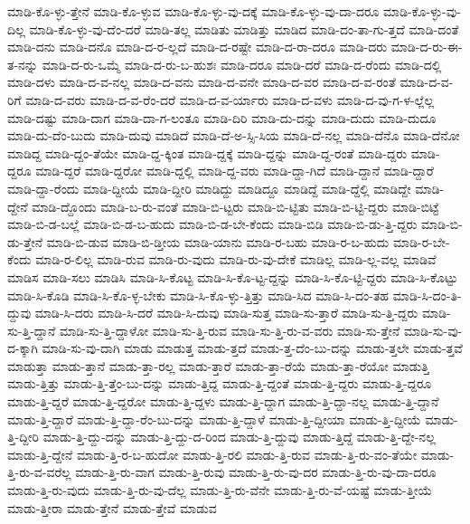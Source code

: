 {ಮಾಡಿ-ಕೊ-ಳ್ಳು-ತ್ತೇನೆ
ಮಾಡಿ-ಕೊ-ಳ್ಳುವ
ಮಾಡಿ-ಕೊ-ಳ್ಳು-ವು-ದಕ್ಕೆ
ಮಾಡಿ-ಕೊ-ಳ್ಳು-ವು-ದಾ-ದರೂ
ಮಾಡಿ-ಕೊ-ಳ್ಳು-ವು-ದಿಲ್ಲ
ಮಾಡಿ-ಕೊ-ಳ್ಳು-ವು-ದೆಂ-ದರೆ
ಮಾಡಿ-ತಲ್ಲ
ಮಾಡಿತು
ಮಾಡಿತ್ತು
ಮಾಡಿದ
ಮಾಡಿ-ದಂ-ತಾ-ಗು-ತ್ತದೆ
ಮಾಡಿ-ದಂತೆ
ಮಾಡಿ-ದನು
ಮಾಡಿ-ದನೊ
ಮಾಡಿ-ದ-ರ-ಲ್ಲದೆ
ಮಾಡಿ-ದ-ರಷ್ಟೇ
ಮಾಡಿ-ದ-ರಾ-ದರೂ
ಮಾಡಿ-ದರು
ಮಾಡಿ-ದ-ರು-ಈ-ತ-ನನ್ನು
ಮಾಡಿ-ದ-ರು-ಒಮ್ಮೆ
ಮಾಡಿ-ದ-ರು-ಬ-ಹುಶಃ
ಮಾಡಿ-ದರೂ
ಮಾಡಿ-ದರೆ
ಮಾಡಿ-ದ-ರೆಂದು
ಮಾಡಿ-ದಲ್ಲಿ
ಮಾಡಿ-ದಳು
ಮಾಡಿ-ದ-ವ-ನಲ್ಲ
ಮಾಡಿ-ದ-ವನು
ಮಾಡಿ-ದ-ವನೇ
ಮಾಡಿ-ದ-ವರ
ಮಾಡಿ-ದ-ವ-ರಂತೆ
ಮಾಡಿ-ದ-ವ-ರಿಗೆ
ಮಾಡಿ-ದ-ವರು
ಮಾಡಿ-ದ-ವ-ರೆಂ-ದರೆ
ಮಾಡಿ-ದ-ವ-ರ್ಯಾರು
ಮಾಡಿ-ದ-ವಳು
ಮಾಡಿ-ದ-ವು-ಗ-ಳ-ಲ್ಲೆಲ್ಲ
ಮಾಡಿ-ದಷ್ಟು
ಮಾಡಿ-ದಾಗ
ಮಾಡಿ-ದಾ-ಗ-ಲಂತೂ
ಮಾಡಿ-ದಿರಿ
ಮಾಡಿ-ದು-ದನ್ನು
ಮಾಡಿ-ದುದು
ಮಾಡಿ-ದುದೂ
ಮಾಡಿ-ದು-ದೆಂ-ಬುದು
ಮಾಡಿ-ದುವು
ಮಾಡಿದೆ
ಮಾಡಿ-ದೆ-ಅ-ಸ್ಸಿ-ಸಿಯ
ಮಾಡಿ-ದೆ-ನಲ್ಲ
ಮಾಡಿ-ದೆನೊ
ಮಾಡಿ-ದೆನೋ
ಮಾಡಿದ್ದ
ಮಾಡಿ-ದ್ದಂ-ತೆಯೇ
ಮಾಡಿ-ದ್ದ-ಕ್ಕಿಂತ
ಮಾಡಿ-ದ್ದಕ್ಕೆ
ಮಾಡಿ-ದ್ದನ್ನು
ಮಾಡಿ-ದ್ದ-ರಂತೆ
ಮಾಡಿ-ದ್ದರು
ಮಾಡಿ-ದ್ದರೂ
ಮಾಡಿ-ದ್ದರೆ
ಮಾಡಿ-ದ್ದರೋ
ಮಾಡಿ-ದ್ದಲ್ಲಿ
ಮಾಡಿ-ದ್ದ-ವರು
ಮಾಡಿ-ದ್ದಾ-ಗಿದೆ
ಮಾಡಿ-ದ್ದಾನೆ
ಮಾಡಿ-ದ್ದಾರೆ
ಮಾಡಿ-ದ್ದಾ-ರೆಂದು
ಮಾಡಿ-ದ್ದೀಯೆ
ಮಾಡಿ-ದ್ದೀರಿ
ಮಾಡಿದ್ದು
ಮಾಡಿದ್ದೂ
ಮಾಡಿದ್ದೆ
ಮಾಡಿ-ದ್ದೆಲ್ಲಿ
ಮಾಡಿದ್ದೇ
ಮಾಡಿ-ದ್ದೇನೆ
ಮಾಡಿ-ದ್ದೊಂದು
ಮಾಡಿ-ಬ-ರು-ವಂತೆ
ಮಾಡಿ-ಬಿ-ಟ್ಟರು
ಮಾಡಿ-ಬಿ-ಟ್ಟಿತು
ಮಾಡಿ-ಬಿ-ಟ್ಟಿ-ದ್ದರು
ಮಾಡಿ-ಬಿಟ್ಟೆ
ಮಾಡಿ-ಬಿ-ಡ-ಬಲ್ಲೆ
ಮಾಡಿ-ಬಿ-ಡ-ಬ-ಹುದು
ಮಾಡಿ-ಬಿ-ಡ-ಬೇ-ಕೆಂದು
ಮಾಡಿ-ಬಿಡಿ
ಮಾಡಿ-ಬಿ-ಡು-ತ್ತಿ-ದ್ದರು
ಮಾಡಿ-ಬಿ-ಡು-ತ್ತೇನೆ
ಮಾಡಿ-ಬಿ-ಡುವ
ಮಾಡಿ-ಬಿ-ಡ್ತೀಯ
ಮಾಡಿ-ಯಾನು
ಮಾಡಿ-ರ-ಬಹು
ಮಾಡಿ-ರ-ಬ-ಹುದು
ಮಾಡಿ-ರ-ಬೇ-ಕೆಂದು
ಮಾಡಿ-ರ-ಲಿಲ್ಲ
ಮಾಡಿ-ರುವ
ಮಾಡಿ-ರು-ವುದು
ಮಾಡಿ-ರು-ವು-ದೇಕೆ
ಮಾಡಿಲ್ಲ
ಮಾಡಿ-ಲ್ಲ-ವಲ್ಲ
ಮಾಡಿವೆ
ಮಾಡಿಸ
ಮಾಡಿ-ಸಲು
ಮಾಡಿಸಿ
ಮಾಡಿ-ಸಿ-ಕೊಟ್ಟ
ಮಾಡಿ-ಸಿ-ಕೊ-ಟ್ಟ-ದ್ದನ್ನು
ಮಾಡಿ-ಸಿ-ಕೊ-ಟ್ಟಿ-ದ್ದರು
ಮಾಡಿ-ಸಿ-ಕೊಟ್ಟು
ಮಾಡಿ-ಸಿ-ಕೊಡಿ
ಮಾಡಿ-ಸಿ-ಕೊ-ಳ್ಳ-ಬೇಕು
ಮಾಡಿ-ಸಿ-ಕೊ-ಳ್ಳು-ತ್ತಿತ್ತು
ಮಾಡಿ-ಸಿದ
ಮಾಡಿ-ಸಿ-ದಂ-ತಹ
ಮಾಡಿ-ಸಿ-ದಂ-ತಿ-ದ್ದುವು
ಮಾಡಿ-ಸಿ-ದರು
ಮಾಡಿ-ಸಿ-ದರೆ
ಮಾಡಿ-ಸಿ-ದುವು
ಮಾಡಿ-ಸುತ್ತ
ಮಾಡಿ-ಸು-ತ್ತಾರೆ
ಮಾಡಿ-ಸು-ತ್ತಿ-ದ್ದರು
ಮಾಡಿ-ಸು-ತ್ತಿ-ದ್ದಾನೆ
ಮಾಡಿ-ಸು-ತ್ತಿ-ದ್ದಾಳೋ
ಮಾಡಿ-ಸು-ತ್ತಿ-ರುವ
ಮಾಡಿ-ಸು-ತ್ತಿ-ರು-ವ-ವರು
ಮಾಡಿ-ಸು-ತ್ತೇನೆ
ಮಾಡಿ-ಸು-ವು-ದ-ಕ್ಕಾಗಿ
ಮಾಡಿ-ಸು-ವು-ದಾಗಿ
ಮಾಡು
ಮಾಡುತ್ತ
ಮಾಡು-ತ್ತದೆ
ಮಾಡು-ತ್ತ-ದೆಂ-ಬು-ದನ್ನು
ಮಾಡು-ತ್ತಲೇ
ಮಾಡು-ತ್ತವೆ
ಮಾಡುತ್ತಾ
ಮಾಡು-ತ್ತಾನೆ
ಮಾಡು-ತ್ತಾ-ರಲ್ಲ
ಮಾಡು-ತ್ತಾರೆ
ಮಾಡು-ತ್ತಾ-ರೆಯೆ
ಮಾಡು-ತ್ತಾ-ರೆಯೋ
ಮಾಡುತ್ತಿ
ಮಾಡು-ತ್ತಿತ್ತು
ಮಾಡು-ತ್ತಿ-ತ್ತೆಂ-ಬು-ದನ್ನು
ಮಾಡು-ತ್ತಿದ್ದ
ಮಾಡು-ತ್ತಿ-ದ್ದಂತೆ
ಮಾಡು-ತ್ತಿ-ದ್ದರು
ಮಾಡು-ತ್ತಿ-ದ್ದರೂ
ಮಾಡು-ತ್ತಿ-ದ್ದರೆ
ಮಾಡು-ತ್ತಿ-ದ್ದರೋ
ಮಾಡು-ತ್ತಿ-ದ್ದಳು
ಮಾಡು-ತ್ತಿ-ದ್ದಾಗ
ಮಾಡು-ತ್ತಿ-ದ್ದಾ-ನಲ್ಲ
ಮಾಡು-ತ್ತಿ-ದ್ದಾನೆ
ಮಾಡು-ತ್ತಿ-ದ್ದಾರೆ
ಮಾಡು-ತ್ತಿ-ದ್ದಾ-ರೆಂ-ಬು-ದನ್ನು
ಮಾಡು-ತ್ತಿ-ದ್ದಾಳೆ
ಮಾಡು-ತ್ತಿ-ದ್ದೀಯಾ
ಮಾಡು-ತ್ತಿ-ದ್ದೀಯೆ
ಮಾಡು-ತ್ತಿ-ದ್ದೀರಿ
ಮಾಡು-ತ್ತಿ-ದ್ದು-ದನ್ನು
ಮಾಡು-ತ್ತಿ-ದ್ದು-ದ-ರಿಂದ
ಮಾಡು-ತ್ತಿ-ದ್ದುವು
ಮಾಡು-ತ್ತಿದ್ದೆ
ಮಾಡು-ತ್ತಿ-ದ್ದೇ-ನಲ್ಲ
ಮಾಡು-ತ್ತಿ-ದ್ದೇನೆ
ಮಾಡು-ತ್ತಿ-ರ-ಬ-ಹುದೋ
ಮಾಡು-ತ್ತಿ-ರಲಿ
ಮಾಡು-ತ್ತಿ-ರುವ
ಮಾಡು-ತ್ತಿ-ರು-ವಂ-ತೆಯೇ
ಮಾಡು-ತ್ತಿ-ರು-ವ-ವರೆಲ್ಲ
ಮಾಡು-ತ್ತಿ-ರು-ವಾಗ
ಮಾಡು-ತ್ತಿ-ರುವು
ಮಾಡು-ತ್ತಿ-ರು-ವು-ದರ
ಮಾಡು-ತ್ತಿ-ರು-ವು-ದಾ-ದರೂ
ಮಾಡು-ತ್ತಿ-ರು-ವುದು
ಮಾಡು-ತ್ತಿ-ರು-ವು-ದೆಲ್ಲ
ಮಾಡು-ತ್ತಿ-ರು-ವೆನೇ
ಮಾಡು-ತ್ತಿ-ರು-ವೆ-ಯಷ್ಟೆ
ಮಾಡು-ತ್ತೀಯೆ
ಮಾಡು-ತ್ತೀರಾ
ಮಾಡು-ತ್ತೇನೆ
ಮಾಡು-ತ್ತೇವೆ
ಮಾಡುವ
}
